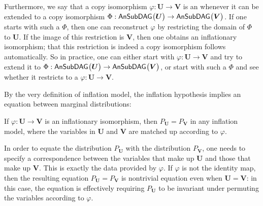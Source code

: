 
Furthermore, we say that a copy isomorphism $\varphi : \bm{U}\to\bm{V}$ is an  whenever it can be extended to a copy isomorphism $\Phi : {\operatorname{\mathsf{AnSubDAG}}_{}}\bigl\lparen\bm{U}\bigr\rparen\to{\operatorname{\mathsf{AnSubDAG}}_{}}\bigl\lparen\bm{V}\bigr\rparen$. If one starts with such a $\Phi$, then one can reconstruct $\varphi$ by restricting the domain of $\Phi$ to $\bm{U}$. If the image of this restriction is $\bm{V}$, then one obtains an inflationary isomorphism; that this restriction is indeed a copy isomorphism follows automatically. So in practice, one can either start with $\varphi : \bm{U}\to\bm{V}$ and try to extend it to $\Phi : {\operatorname{\mathsf{AnSubDAG}}_{}}\bigl\lparen\bm{U}\bigr\rparen\to{\operatorname{\mathsf{AnSubDAG}}_{}}\bigl\lparen\bm{V}\bigr\rparen$, or start with such a $\Phi$ and see whether it restricts to a $\varphi:\bm{U}\to\bm{V}$.



By the very definition of inflation model, the inflation hypothesis implies an equation between marginal distributions:

\begin{lemma}
	If $\varphi:\bm{U}\to\bm{V}$ is an inflationary isomorphism, then $P_{\bm{U}} = P_{\bm{V}}$ in any inflation model, where the variables in $\bm{U}$ and $\bm{V}$ are matched up according to $\varphi$.
	\label{lem:coincide}
\end{lemma}

In order to equate the distribution $P_{\bm{U}}$ with the distribution $P_{\bm{V}}$, one needs to specify a correspondence between the variables that make up $\bm{U}$ and those that make up $\bm{V}$. This is exactly the data provided by $\varphi$. If $\varphi$ is not the identity map, then the resulting equation $P_{\bm{U}} = P_{\bm{V}}$ is nontrivial equation even when $\bm{U}=\bm{V}$: in this case, the equation is effectively requiring $P_{\bm{U}}$ to be invariant under permuting the variables according to $\varphi$.

